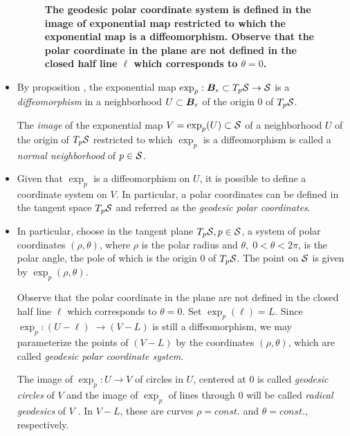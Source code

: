 \documentclass[11pt]{article}
\begin{document}
\begin{itemize}
\begin{figure}[htb]
\begin{minipage}{0.6\linewidth}
\end{minipage}
\caption{\scriptsize
\textbf{The geodesic polar coordinate system is defined in the image of exponential map restricted to which the exponential map is a diffeomorphism.  Observe that the polar coordinate in the plane are not defined in the closed half line $\ell$ which corresponds to $\theta=0$. }}\vspace{-10pt}
\end{figure}

\item  \begin{definition}
By proposition , the exponential map $\exp_{p}: \boldsymbol{B}_{\epsilon}\subset T_{p}{\mathcal S} \rightarrow {\mathcal S}$ is a \emph{diffeomorphism} in a neighborhood $U \subset \boldsymbol{B}_{\epsilon}$ of the origin $0$ of $T_{p}{\mathcal S}$. 

 The \emph{image} of the exponential map $V = \exp_{p}(U) \subset {\mathcal S}$ of a neighborhood $U$ of the origin of $T_{p}{\mathcal S}$ restricted to which $\exp_{p}$ is a diffeomorphism is called a \emph{normal neighborhood} of $p\in {\mathcal S}$.\\
\end{definition}

\item \begin{definition} 
Given that $\exp_{p}$ is a diffeomorphism on $U$, it is possible to define a coordinate system on $V$. In particular, a polar coordinates can be defined in the tangent space $T_{p}{\mathcal S}$ and referred as the \emph{geodesic polar coordinates}. 
  \end{definition}


\item In particular, choose in the tangent plane $T_{p}{\mathcal S}, p\in {\mathcal S}$, a system of polar coordinates $(\rho, \theta)$, where $\rho$ is the polar radius and $\theta, \; 0<\theta<2\pi$, is the polar angle, the pole of which is  the origin $0$ of $T_{p}{\mathcal S}$. The point on ${\mathcal S}$ is given by $\exp_{p}(\rho, \theta).$

Observe that the polar coordinate in the plane are not defined in the closed half line $\ell$ which corresponds to $\theta=0$. Set $\exp_{p}(\ell) = L$. Since $\exp_{p}: (U-\ell)\; \rightarrow (V-L)$ is still a diffeomorphism, we may parameterize the points of $(V-L)$ by the coordinates $(\rho, \theta)$, which are called \emph{geodesic polar coordinate system}. 

The image of $\exp_{p}: U\rightarrow V$ of circles in $U$, centered at $0$ is called \emph{geodesic circles} of $V$ and the image of $\exp_{p}$ of lines through $0$ will be called \emph{radical geodesics} of $V$ \citep{do1976differential}. In $V-L$, these are curves $\rho = const.$ and $\theta = const.$, respectively. 


\end{itemize}
\end{document}
